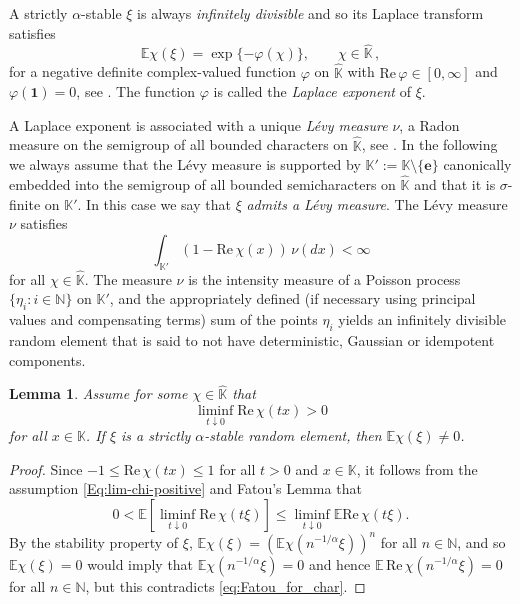\documentclass[12pt]{amsart}
\numberwithin{equation}{section}
\numberwithin{figure}{section}
\theoremstyle{plain} \newtheorem{theorem}{Theorem}[section]
\theoremstyle{plain} \newtheorem{proposition}[theorem]{Proposition}
\theoremstyle{plain} \newtheorem{lemma}[theorem]{Lemma}
\theoremstyle{plain} \newtheorem{corollary}[theorem]{Corollary}
\theoremstyle{definition} \newtheorem{definition}[theorem]{Definition}
\theoremstyle{definition} \newtheorem{notation}[theorem]{Notation}
\theoremstyle{remark} \newtheorem{remark}[theorem]{Remark}
\theoremstyle{remark} \newtheorem{example}[theorem]{Example}
\theoremstyle{definition} \newtheorem{assumption}{Assumption}
\newcommand{\bE}{\mathbb{E}}
\newcommand{\bK}{\mathbb{K}}
\newcommand{\bN}{\mathbb{N}}
\newcommand{\one}{\mathbf{1}}
\newcommand{\bKH}{\hat{\bK}}
\newcommand{\neutral}{\mathbf{e}}
\renewcommand{\phi}{\varphi}
\renewcommand{\Re}{\mathrm{Re}\,}
\begin{document}
A strictly $\alpha$-stable $\xi$ is always \emph{infinitely divisible}
and so its Laplace transform satisfies
\begin{equation}
  \label{Eq:Laplace-exponent}
  \bE\chi(\xi)=\exp\{-\phi(\chi)\},\qquad \chi\in\bKH\,,
\end{equation}
for a negative definite complex-valued function $\phi$ on $\bKH$ with
$\Re\phi\in[0,\infty]$ and $\phi(\one)=0$, see \cite[Th.~3.2.2,
Prop.~4.3.1]{ber:c:r}. The function $\phi$ is called the \emph{Laplace
  exponent} of $\xi$. 
	
A Laplace exponent is associated with a unique \emph{L\'evy measure}
$\nu$, a Radon measure on the semigroup of all bounded characters on
$\bKH$, see \cite{ber:c:r}.  In the following we always assume that the
L\'evy measure is supported by $\bK':=\bK\setminus\{\neutral\}$
canonically embedded 
into the semigroup of all bounded semicharacters on $\bKH$ and
that it is $\sigma$-finite on $\bK'$. In this case we say that $\xi$
\emph{admits a L\'evy measure}.  The L\'evy measure $\nu$ satisfies
\begin{equation}
  \label{eq:lev-mes}
  \int_{\bK'}(1-\Re \chi(x))\,\nu(dx)<\infty
\end{equation}
for all $\chi\in\bKH$.  The measure $\nu$ is the intensity measure of
a Poisson process $\{\eta_i: i\in\bN\}$ on $\bK'$, and the
appropriately defined (if necessary using principal values and
compensating terms) sum of the points $\eta_i$ yields an infinitely
divisible random element that is said to not have deterministic,
Gaussian or idempotent components.

\begin{lemma}
  \label{lemma:non-zero}
  Assume for some $\chi\in\bKH$ that
  \begin{equation}
    \label{Eq:lim-chi-positive}
    \liminf_{t\downarrow0} \Re\chi(tx)>0
  \end{equation}
  for all $x\in\bK$.  If $\xi$ is a strictly $\alpha$-stable random
  element, then $\bE\chi(\xi)\neq 0$.
\end{lemma}

\begin{proof}
  Since $-1 \le \Re\chi(t x) \le 1$ for all $t > 0$ and $x \in \bK$,
  it follows from the assumption \eqref{Eq:lim-chi-positive} and
  Fatou's Lemma that
  \begin{equation}
    \label{eq:Fatou_for_char}
    0 < \bE \left[\liminf_{t\downarrow0} \Re\chi(t\xi)\right]
    \le \liminf_{t\downarrow0} \bE \Re\chi(t\xi).
  \end{equation}
  By the stability property of $\xi$, $\bE\chi(\xi) =
  (\bE\chi(n^{-1/\alpha}\xi))^n$ for all $n \in \bN$, and so
  $\bE\chi(\xi) = 0$ would imply that $\bE\chi(n^{-1/\alpha}\xi)=0$
  and hence $\bE\,\Re\chi(n^{-1/\alpha}\xi)=0$ for all $n \in \bN$,
  but this contradicts \eqref{eq:Fatou_for_char}.
\end{proof}
\end{document}
